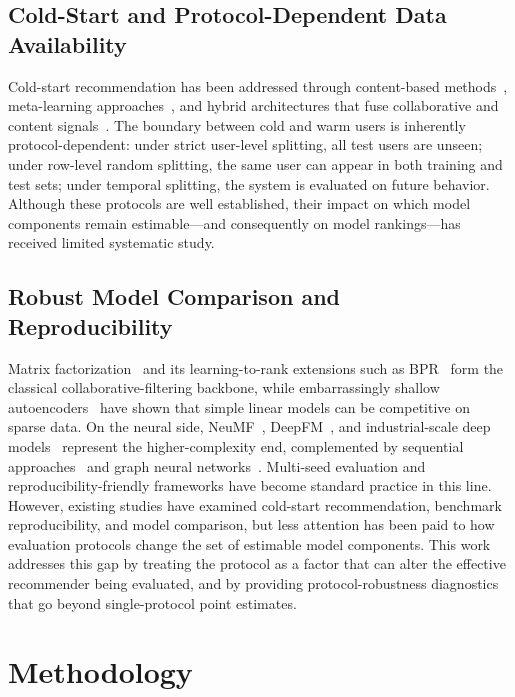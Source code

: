 \documentclass[journal]{IEEEtran}
\begin{document}
\subsection{Cold-Start and Protocol-Dependent Data Availability}
Cold-start recommendation has been addressed through content-based methods~\cite{schein2002methods}, meta-learning approaches~\cite{vartak2017meta}, and hybrid architectures that fuse collaborative and content signals~\cite{elkahky2015multi}. The boundary between cold and warm users is inherently protocol-dependent: under strict user-level splitting, all test users are unseen; under row-level random splitting, the same user can appear in both training and test sets; under temporal splitting, the system is evaluated on future behavior. Although these protocols are well established, their impact on which model components remain estimable---and consequently on model rankings---has received limited systematic study.

\subsection{Robust Model Comparison and Reproducibility}
Matrix factorization~\cite{koren2009matrix} and its learning-to-rank extensions such as BPR~\cite{rendle2009bpr} form the classical collaborative-filtering backbone, while embarrassingly shallow autoencoders~\cite{steck2019ease} have shown that simple linear models can be competitive on sparse data. On the neural side, NeuMF~\cite{he2017neural}, DeepFM~\cite{guo2017deepfm}, and industrial-scale deep models~\cite{covington2016deep} represent the higher-complexity end, complemented by sequential approaches~\cite{kang2018sasrec,sun2019bert4rec} and graph neural networks~\cite{wang2019ngcf,he2020lightgcn}. Multi-seed evaluation and reproducibility-friendly frameworks have become standard practice in this line. However, existing studies have examined cold-start recommendation, benchmark reproducibility, and model comparison, but less attention has been paid to how evaluation protocols change the set of estimable model components. This work addresses this gap by treating the protocol as a factor that can alter the effective recommender being evaluated, and by providing protocol-robustness diagnostics that go beyond single-protocol point estimates.

\section{Methodology}
\label{sec:method}
\end{document}
